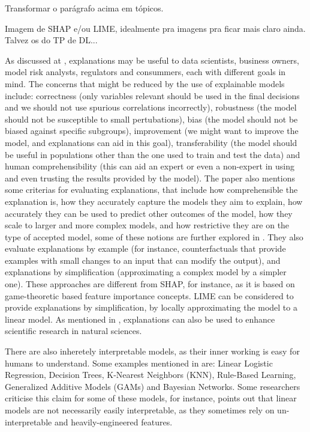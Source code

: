 {\color{red} Transformar o parágrafo acima em tópicos.}

{\color{red} Imagem de SHAP e/ou LIME, idealmente pra imagens pra ficar mais claro ainda. Talvez os do TP de DL...}

As discussed at \cite{belle2021principles}, explanations may be useful to data scientists, business owners, model risk analysts, regulators and consummers, each with different goals in mind. The concerns that might be reduced by the use of explainable models include: correctness (only variables relevant should be used in the final decisions and we should not use spurious correlations incorrectly), robustness (the model should not be susceptible to small pertubations), bias (the model should not be biased against specific subgroups), improvement (we might want to improve the model, and explanations can aid in this goal), transferability (the model should be useful in populations other than the one used to train and test the data) and human comprehensibility (this can aid an expert or even a non-expert in using and even trusting the results provided by the model). The paper also mentions some criterias for evaluating explanations, that include how comprehensible the explanation is, how they accurately capture the models they aim to explain, how accurately they can be used to predict other outcomes of the model, how they scale to larger and more complex models, and how restrictive they are on the type of accepted model, some of these notions are further explored in \cite{carvalho2019machine}. They also evaluate explanations by example (for instance, counterfactuals \cite{verma2020counterfactual} that provide examples with small changes to an input that can modify the output), and explanations by simplification (approximating a complex model by a simpler one). These approaches are different from SHAP, for instance, as it is based on game-theoretic based feature importance concepts. LIME can be considered to provide explanations by simplification, by locally approximating the model to a linear model. As mentioned in \cite{roscher2020explainable}, explanations can also be used to enhance scientific research in natural sciences.

There are also inheretely interpretable models, as their inner working is easy for humans to understand. Some examples mentioned in \cite{belle2021principles} are: Linear Logistic Regression, Decision Trees, K-Nearest Neighbors (KNN), Rule-Based Learning, Generalized Additive Models (GAMs) and Bayesian Networks. Some researchers criticise this claim for some of these models, for instance, \cite{lipton2018mythos} points out that linear models are not necessarily easily interpretable, as they sometimes rely on un-interpretable and heavily-engineered features.

